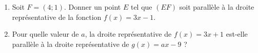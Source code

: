
\begin{exercice}\label{exosmath-0110}

    \begin{enumerate}
        \item
            Soit \( F=(4;1)\). Donner un point \( E\) tel que \( (EF)\) soit parallèle à la droite représentative de la fonction \( f(x)=3x-1\).
        \item
            Pour quelle valeur de \( a\), la droite représentative de \( f(x)=3x+1\) est-elle parallèle à la droite représentative de \( g(x)=ax-9\) ?
    \end{enumerate}

\end{exercice}
